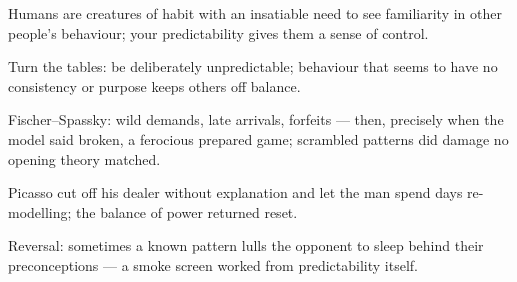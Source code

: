 

\begin{distilled}
  \item Humans are creatures of habit with an insatiable need to see familiarity in other people's behaviour; your predictability gives them a sense of control.
  \item Turn the tables: be deliberately unpredictable; behaviour that seems to have no consistency or purpose keeps others off balance.
  \item Fischer--Spassky: wild demands, late arrivals, forfeits --- then, precisely when the model said broken, a ferocious prepared game; scrambled patterns did damage no opening theory matched.
  \item Picasso cut off his dealer without explanation and let the man spend days re-modelling; the balance of power returned reset.
  \item Reversal: sometimes a known pattern lulls the opponent to sleep behind their preconceptions --- a smoke screen worked from predictability itself.
\end{distilled}
